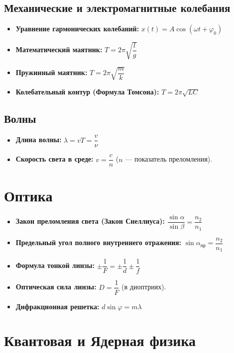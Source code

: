 \documentclass[11pt, a4paper]{article}
\begin{document}
\subsection{Механические и электромагнитные колебания}
\begin{itemize}
    \item \textbf{Уравнение гармонических колебаний:} $x(t) = A \cos(\omega t + \varphi_0)$
    \item \textbf{Математический маятник:} $T = 2\pi \sqrt{\dfrac{l}{g}}$
    \item \textbf{Пружинный маятник:} $T = 2\pi \sqrt{\dfrac{m}{k}}$
    \item \textbf{Колебательный контур (Формула Томсона):} $T = 2\pi \sqrt{L C}$
\end{itemize}

\subsection{Волны}
\begin{itemize}
    \item \textbf{Длина волны:} $\lambda = v T = \dfrac{v}{\nu}$
    \item \textbf{Скорость света в среде:} $v = \dfrac{c}{n}$ \quad ($n$ --- показатель преломления).
\end{itemize}

\section{Оптика}

\begin{itemize}
    \item \textbf{Закон преломления света (Закон Снеллиуса):} $\dfrac{\sin\alpha}{\sin\beta} = \dfrac{n_2}{n_1}$
    \item \textbf{Предельный угол полного внутреннего отражения:} $\sin\alpha_{\text{пр}} = \dfrac{n_2}{n_1}$
    \item \textbf{Формула тонкой линзы:} $\pm \dfrac{1}{F} = \pm \dfrac{1}{d} \pm \dfrac{1}{f}$
    \item \textbf{Оптическая сила линзы:} $D = \dfrac{1}{F}$ (в диоптриях).
    \item \textbf{Дифракционная решетка:} $d \sin\varphi = m \lambda$
\end{itemize}

\section{Квантовая и Ядерная физика}
\end{document}
